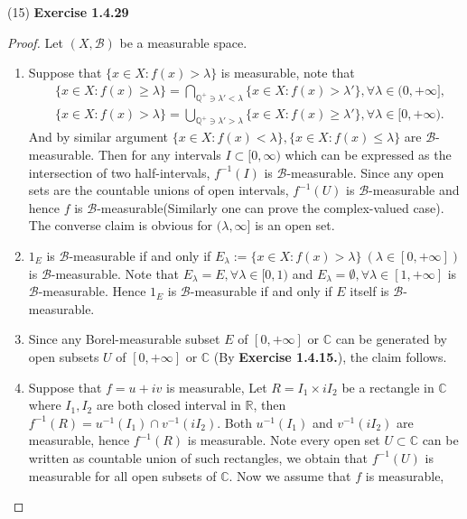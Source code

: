 \documentclass[a4paper]{article}
\begin{document}
(15) {\bfseries Exercise 1.4.29}\begin{proof}
Let $(X, \mathcal{B})$ be a measurable space.\begin{enumerate}[label = (\roman*)]
    \item Suppose that $\{x \in X : f(x) > \lambda\}$ is measurable, note that\begin{align*}
    &\{x \in X : f(x) \geq \lambda\} = \bigcap_{\mathbb{Q}^+ \ni \lambda' < \lambda}\{x \in X : f(x) > \lambda'\},
    \forall \lambda \in (0, +\infty],\\
    &\{x \in X : f(x) > \lambda\} = \bigcup_{\mathbb{Q}^+ \ni \lambda' > \lambda} \{x \in X : f(x) \geq \lambda'\},
    \forall \lambda \in [0, +\infty).
    \end{align*}
    And by similar argument $\{x \in X : f(x) < \lambda\}, \{x \in X : f(x) \leq \lambda\}$ are $\mathcal{B}$-measurable.
    Then for any intervals $I \subset [0, \infty)$ which can be expressed as the intersection of two half-intervals,
    $f^{-1}(I)$ is $\mathcal{B}$-measurable. Since any open sets are the countable unions of open intervals, $f^{-1}(U)$
    is $\mathcal{B}$-measurable and hence $f$ is $\mathcal{B}$-measurable(Similarly one can prove the complex-valued case).
    The converse claim is obvious for $(\lambda, \infty]$ is an open set.
    \item $1_E$ is $\mathcal{B}$-measurable if and only if $E_\lambda := \{x \in X : f(x) > \lambda\}\ (\lambda \in [0, +\infty])$ 
    is $\mathcal{B}$-measurable. Note that $E_\lambda = E, \forall \lambda \in [0, 1)$ and $E_\lambda = \emptyset, 
    \forall \lambda \in [1, +\infty]$ is $\mathcal{B}$-measurable. Hence $1_E$ is $\mathcal{B}$-measurable if and 
    only if $E$ itself is $\mathcal{B}$-measurable.
    \item Since any Borel-measurable subset $E$ of $[0, +\infty]$ or $\mathbb{C}$ can be generated by open subsets
     $U$ of $[0, +\infty]$ or $\mathbb{C}$ (By {\bfseries Exercise 1.4.15.}), the claim follows.
    \item Suppose that $f = u + iv$ is measurable, Let $R = I_1 \times iI_2$ be a rectangle in $\mathbb{C}$ where $I_1, I_2$ are both closed interval in $\mathbb{R}$, 
    then $f^{-1}(R) = u^{-1}(I_1) \cap v^{-1}(iI_2)$. Both $u^{-1}(I_1)$ and $v^{-1}(iI_2)$ are measurable, 
    hence $f^{-1}(R)$ is measurable. Note every open set $U \subset \mathbb{C}$ can be written as countable union of such rectangles, 
    we obtain that $f^{-1}(U)$ is measurable for all open subsets of $\mathbb{C}$. 
    Now we assume that $f$ is measurable, 

\end{enumerate}
\end{proof}
\end{document}
